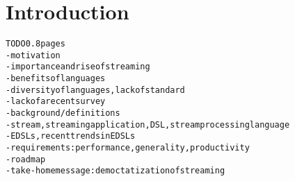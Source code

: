 \section{Introduction}\label{sec:introduction}

\begin{alltt}TODO\scriptsize 0.8 pages
- motivation
  - importance and rise of streaming
  - benefits of languages
  - diversity of languages, lack of standard
  - lack of a recent survey
- background / definitions
  - stream, streaming application, DSL, stream processing language
  - EDSLs \cite{hudak_1998}, recent trends in EDSLs
  - requirements: performance, generality, productivity
- roadmap
- take-home message: democtatization of streaming
\end{alltt}
